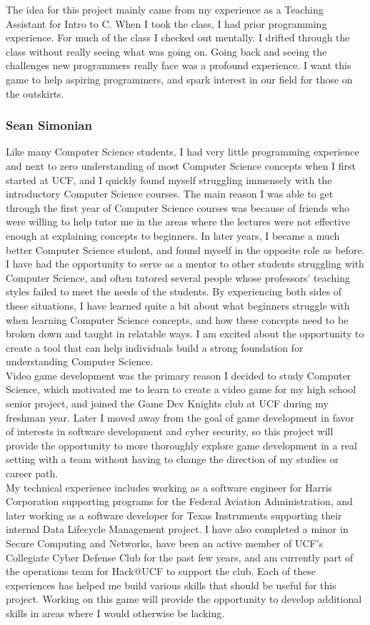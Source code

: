 The idea for this project mainly came from my experience as a Teaching Assistant for Intro to
C. When I took the class, I had prior programming experience. For much of the class I
checked out mentally. I drifted through the class without really seeing what was going on.
Going back and seeing the challenges new programmers really face was a profound
experience. I want this game to help aspiring programmers, and spark interest in
our field for those on the outskirts.

\subsubsection{Sean Simonian}
Like many Computer Science students, I had very little programming experience
and next to zero understanding of most Computer Science concepts when I first
started at UCF, and I quickly found myself struggling immensely with the
introductory Computer Science courses. The main reason I was able to get through
the first year of Computer Science courses was because of friends who were
willing to help tutor me in the areas where the lectures were not effective
enough at explaining concepts to beginners. In later years, I became a much
better Computer Science student, and found myself in the opposite role as
before. I have had the opportunity to serve as a mentor to other students
struggling with Computer Science, and often tutored several people whose
professors’ teaching styles failed to meet the needs of the students. By
experiencing both sides of these situations, I have learned quite a bit about
what beginners struggle with when learning Computer Science concepts, and how
these concepts need to be broken down and taught in relatable ways. I am excited
about the opportunity to create a tool that can help individuals build a strong
foundation for understanding Computer Science.\\

Video game development was the primary reason I decided to study Computer
Science, which motivated me to learn to create a video game for my high school
senior project, and joined the Game Dev Knights club at UCF during my freshman
year. Later I moved away from the goal of game development in favor of interests
in software development and cyber security, so this project will provide the
opportunity to more thoroughly explore game development in a real setting with a
team without having to change the direction of my studies or career path.\\

My technical experience includes working as a software engineer for Harris
Corporation supporting programs for the Federal Aviation Administration, and
later working as a software developer for Texas Instruments supporting their
internal Data Lifecycle Management project. I have also completed a minor in
Secure Computing and Networks, have been an active member of UCF’s Collegiate
Cyber Defense Club for the past few years, and am currently part of the
operations team for Hack@UCF to support the club. Each of these experiences has
helped me build various skills that should be useful for this project. Working
on this game will provide the opportunity to develop additional skills in areas
where I would otherwise be lacking.\\
